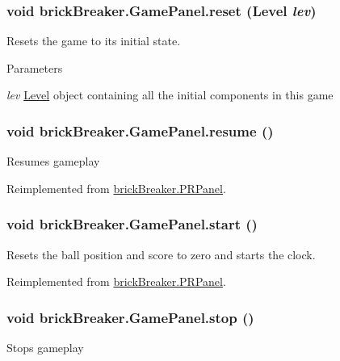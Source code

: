 \hypertarget{classbrick_breaker_1_1_game_panel_a55dcdeddbe45e2a0d1b4e3ac792aefc4}{
\subsubsection[{reset}]{\setlength{\rightskip}{0pt plus 5cm}void brickBreaker.GamePanel.reset ({\bf Level} {\em lev})}}
\label{classbrick_breaker_1_1_game_panel_a55dcdeddbe45e2a0d1b4e3ac792aefc4}
Resets the game to its initial state. 
\begin{DoxyParams}{Parameters}
\item[{\em lev}]\hyperlink{classbrick_breaker_1_1_level}{Level} object containing all the initial components in this game \end{DoxyParams}
\hypertarget{classbrick_breaker_1_1_game_panel_af987d9ffe6d1d68941a93547bab41cfe}{
\subsubsection[{resume}]{\setlength{\rightskip}{0pt plus 5cm}void brickBreaker.GamePanel.resume ()}}
\label{classbrick_breaker_1_1_game_panel_af987d9ffe6d1d68941a93547bab41cfe}
Resumes gameplay 

Reimplemented from \hyperlink{classbrick_breaker_1_1_p_r_panel_ac9aadc88543f9032a27f3eb2b8ea908b}{brickBreaker.PRPanel}.

\hypertarget{classbrick_breaker_1_1_game_panel_ac06637c2b612d44711aebefde82249bc}{
\subsubsection[{start}]{\setlength{\rightskip}{0pt plus 5cm}void brickBreaker.GamePanel.start ()}}
\label{classbrick_breaker_1_1_game_panel_ac06637c2b612d44711aebefde82249bc}
Resets the ball position and score to zero and starts the clock. 

Reimplemented from \hyperlink{classbrick_breaker_1_1_p_r_panel_a94e190e70d6aa937068cbf5e8cff523e}{brickBreaker.PRPanel}.

\hypertarget{classbrick_breaker_1_1_game_panel_adda952b668cd479832134a4c0ddfbc41}{
\subsubsection[{stop}]{\setlength{\rightskip}{0pt plus 5cm}void brickBreaker.GamePanel.stop ()}}
\label{classbrick_breaker_1_1_game_panel_adda952b668cd479832134a4c0ddfbc41}
Stops gameplay 


